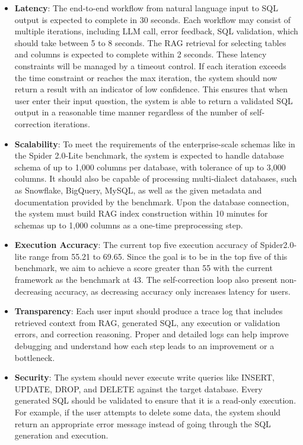 
\begin{itemize}
    \item \textbf{Latency}: The end-to-end workflow from natural language input to SQL output is expected to complete in 30 seconds. Each workflow may consist of multiple iterations, including LLM call, error feedback, SQL validation, which should take between 5 to 8 seconds. The RAG retrieval for selecting tables and columns is expected to complete within 2 seconds. These latency constraints will be managed by a timeout control. If each iteration exceeds the time constraint or reaches the max iteration, the system should now return a result with an indicator of low confidence. This ensures that when user enter their input question, the system is able to return a validated SQL output in a reasonable time manner regardless of the number of self-correction iterations.
    \item \textbf{Scalability}: To meet the requirements of the enterprise-scale schemas like in the Spider 2.0-Lite benchmark, the system is expected to handle database schema of up to 1,000 columns per database, with tolerance of up to 3,000 columns. It should also be capable of processing multi-dialect databases, such as Snowflake, BigQuery, MySQL, as well as the given metadata and documentation provided by the benchmark. Upon the database connection, the system must build RAG index construction within 10 minutes for schemas up to 1,000 columns as a one-time preprocessing step.
    \item \textbf{Execution Accuracy}: The current top five execution accuracy of Spider2.0-lite range from 55.21 to 69.65. Since the goal is to be in the top five of this benchmark, we aim to achieve a score greater than 55 with the current framework as the benchmark at 43. The self-correction loop also present non-decreasing accuracy, as decreasing accuracy only increases latency for users.
    \item \textbf{Transparency}: Each user input should produce a trace log that includes retrieved context from RAG, generated SQL, any execution or validation errors, and correction reasoning. Proper and detailed logs can help improve debugging and understand how each step leads to an improvement or a bottleneck.
    \item \textbf{Security}: The system should never execute write queries like INSERT, UPDATE, DROP, and DELETE against the target database. Every generated SQL should be validated to ensure that it is a read-only execution. For example, if the user attempts to delete some data, the system should return an appropriate error message instead of going through the SQL generation and execution.
\end{itemize}

